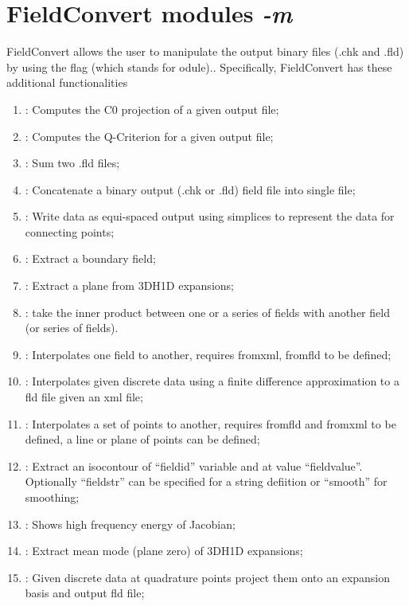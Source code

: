 \section{FieldConvert modules \textit{-m}}
FieldConvert allows the user to manipulate the \nekpp output
binary files (.chk and .fld) by using the flag  (which
stands for odule)..
Specifically, FieldConvert has these additional functionalities
%
\begin{enumerate}
\item {}: Computes the C0 projection of a given output file;
\item {}: Computes the Q-Criterion for a given output file;
\item {}: Sum two .fld files;
\item {}: Concatenate a \nekpp binary output (.chk or .fld) field file into single file;
\item {}: Write data as equi-spaced output using simplices to represent the data for connecting points;
\item {}: Extract a boundary field;
\item {}: Extract a plane from 3DH1D expansions;
\item {}: take the inner product between one or a series of fields with another field (or series of fields). 
\item {}: Interpolates one field to another, requires fromxml, fromfld to be defined;
\item {}: Interpolates given discrete data using a finite difference approximation to a fld file given an xml file;
\item {}: Interpolates a set of points to another, requires fromfld and fromxml to be defined, a line or plane of points can be defined;
\item {}: Extract an isocontour of ``fieldid'' variable and at value ``fieldvalue''. Optionally ``fieldstr'' can be specified for a string defiition or ``smooth'' for smoothing;
\item {}: Shows high frequency energy of Jacobian;
\item {}: Extract mean mode (plane zero) of 3DH1D expansions;
\item {}: Given discrete data at quadrature points
  project them onto an expansion basis and output fld file; 

\end{enumerate}
